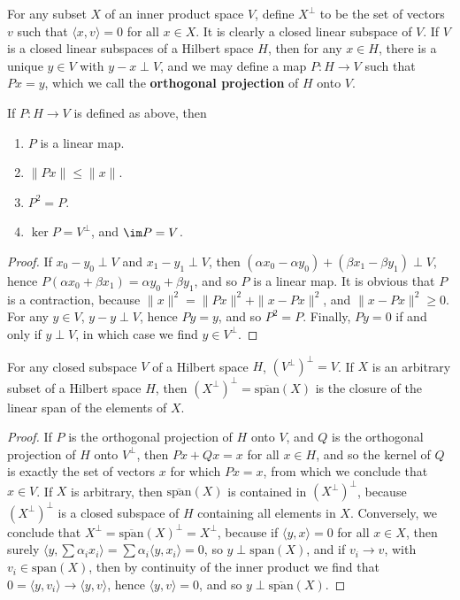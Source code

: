For any subset $X$ of an inner product space $V$, define $X^\perp$ to be the set of vectors $v$ such that $\langle x, v \rangle = 0$ for all $x \in X$. It is clearly a closed linear subspace of $V$. If $V$ is a closed linear subspaces of a Hilbert space $H$, then for any $x \in H$, there is a unique $y \in V$ with $y - x \perp V$, and we may define a map $P: H \to V$ such that $Px = y$, which we call the {\bf orthogonal projection} of $H$ onto $V$.

\begin{theorem}
    If $P: H \to V$ is defined as above, then
    \begin{enumerate}
        \item $P$ is a linear map.
        \item $\| Px \| \leq \| x \|$.
        \item $P^2 = P$.
        \item $\ker P = V^\perp$, and $\im P = V$.
    \end{enumerate}
\end{theorem}
\begin{proof}
    If $x_0 - y_0 \perp V$ and $x_1 - y_1 \perp V$, then $(\alpha x_0 - \alpha y_0) + (\beta x_1 - \beta y_1) \perp V$, hence $P(\alpha x_0 + \beta x_1) = \alpha y_0 + \beta y_1$, and so $P$ is a linear map. It is obvious that $P$ is a contraction, because $\| x \|^2 = \| Px \|^2 + \| x - Px \|^2$, and $\| x - Px \|^2 \geq 0$. For any $y \in V$, $y - y \perp V$, hence $Py = y$, and so $P^2 = P$. Finally, $Py = 0$ if and only if $y \perp V$, in which case we find $y \in V^\perp$.
\end{proof}

\begin{corollary}
    For any closed subspace $V$ of a Hilbert space $H$, $(V^\perp)^\perp = V$. If $X$ is an arbitrary subset of a Hilbert space $H$, then $(X^\perp)^\perp = \overline{\text{span}}(X)$ is the closure of the linear span of the elements of $X$.
\end{corollary}
\begin{proof}
    If $P$ is the orthogonal projection of $H$ onto $V$, and $Q$ is the orthogonal projection of $H$ onto $V^\perp$, then $Px + Qx = x$ for all $x \in H$, and so the kernel of $Q$ is exactly the set of vectors $x$ for which $Px = x$, from which we conclude that $x \in V$. If $X$ is arbitrary, then $\overline{\text{span}}(X)$ is contained in $(X^\perp)^\perp$, because $(X^\perp)^\perp$ is a closed subspace of $H$ containing all elements in $X$. Conversely, we conclude that $X^\perp = \overline{\text{span}}(X)^\perp = X^\perp$, because if $\langle y, x \rangle = 0$ for all $x \in X$, then surely $\langle y, \sum \alpha_i x_i \rangle = \sum \alpha_i \langle y, x_i \rangle = 0$, so $y \perp \text{span}(X)$, and if $v_i \to v$, with $v_i \in \text{span}(X)$, then by continuity of the inner product we find that $0 = \langle y, v_i \rangle \to \langle y, v \rangle$, hence $\langle y, v \rangle = 0$, and so $y \perp \overline{\text{span}}(X)$.
\end{proof}

